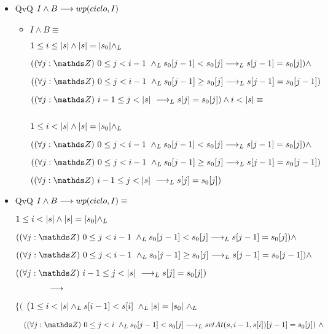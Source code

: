 \documentclass{article}
\begin{document}
    \begin{itemize}

        \item QvQ $ I \wedge B \longrightarrow wp(ciclo,I)$

        \begin{itemize}
        
            \item $I \wedge B \equiv$
        
        $1 \leq i \leq |s| \wedge |s| = |s_0| \land _L$

        $(\paraTodo{j}{0}{i-1} \yLuego s_0[j-1] < s_0[j] \implicaLuego s[j-1] = s_0[j]) \wedge $

        $(\paraTodo{j}{0}{i-1} \yLuego s_0[j-1] \geq s_0[j] \implicaLuego s[j-1] = s_0[j-1])$

        $(\paraTodo{j}{i-1}{\longitud{s}} \implicaLuego s[j] = s_0[j]) \wedge i < \longitud{s} \equiv $

        $ $ 

        $1 \leq i < |s| \wedge |s| = |s_0| \land _L$

        $(\paraTodo{j}{0}{i-1} \yLuego s_0[j-1] < s_0[j] \implicaLuego s[j-1] = s_0[j]) \wedge $

        $(\paraTodo{j}{0}{i-1} \yLuego s_0[j-1] \geq s_0[j] \implicaLuego s[j-1] = s_0[j-1])$

        $(\paraTodo{j}{i-1}{\longitud{s}} \implicaLuego s[j] = s_0[j])$

        \end{itemize}

        \item QvQ $ I \wedge B \longrightarrow wp(ciclo,I) \equiv $

        $ 1 \leq i < |s| \wedge |s| = |s_0| \land _L$

        $ (\paraTodo{j}{0}{i-1} \yLuego s_0[j-1] < s_0[j] \implicaLuego s[j-1] = s_0[j]) \wedge $

        $ (\paraTodo{j}{0}{i-1} \yLuego s_0[j-1] \geq s_0[j] \implicaLuego s[j-1] = s_0[j-1]) \wedge$

        $ (\paraTodo{j}{i-1}{\longitud{s}} \implicaLuego s[j] = s_0[j])$

        $ \qquad\qquad \longrightarrow$

        $ \Big\{ \Big( $
        $ \big(1 \leq i < \longitud{s} \yLuego s[i-1] < s[i]\ \yLuego \longitud{s} = \longitud{s_0}\ \yLuego $
    
        $ \quad (\paraTodo{j}{0}{i} \yLuego s_0[j-1] < s_0[j] \implicaLuego setAt(s,i-1, s[i])[j-1] = s_0[j])\ \wedge $


\end{itemize}
\end{document}
